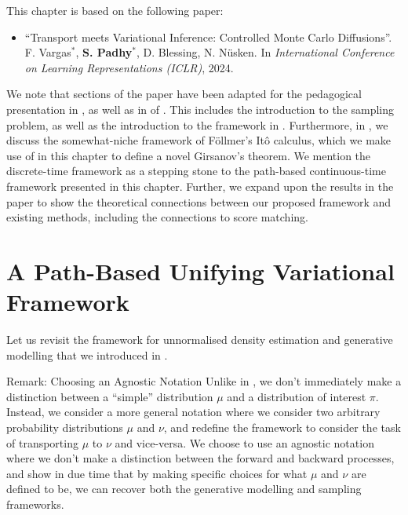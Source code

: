This chapter is based on the following paper:
\begin{itemize}
    \item ``Transport meets Variational Inference: Controlled Monte Carlo Diffusions''. F. Vargas$^{*}$, \textbf{S. Padhy}$^{*}$, D. Blessing, N. Nüsken. In \textit{International Conference on Learning Representations (ICLR)}, 2024.
\end{itemize}
We note that sections of the paper have been adapted for the pedagogical presentation in , as well as in  of . This includes the introduction to the sampling problem, as well as the introduction to the framework in . Furthermore, in , we discuss the somewhat-niche framework of F{\"o}llmer's It\^o calculus, which we make use of in this chapter to define a novel Girsanov's theorem. We mention the discrete-time framework as a stepping stone to the path-based continuous-time framework presented in this chapter. Further, we expand upon the results in the paper to show the theoretical connections between our proposed framework and existing methods, including the connections to score matching.

\section{A Path-Based Unifying Variational Framework}
\label{sec:path_unifying_framework}
Let us revisit the framework for unnormalised density estimation and generative modelling that we introduced in . 

\begin{lightgraybox}{Remark: Choosing an Agnostic Notation}
    Unlike in , we don't immediately make a distinction between a ``simple'' distribution $\mu$ and a distribution of interest $\pi$. Instead, we consider a more general notation where we consider two arbitrary probability distributions $\mu$ and $\nu$, and redefine the framework to consider the task of transporting $\mu$ to $\nu$ and vice-versa. We choose to use an agnostic notation where we don't make a distinction between the forward and backward processes, and show in due time that by making specific choices for what $\mu$ and $\nu$ are defined to be, we can recover both the generative modelling and sampling frameworks.
\end{lightgraybox}

